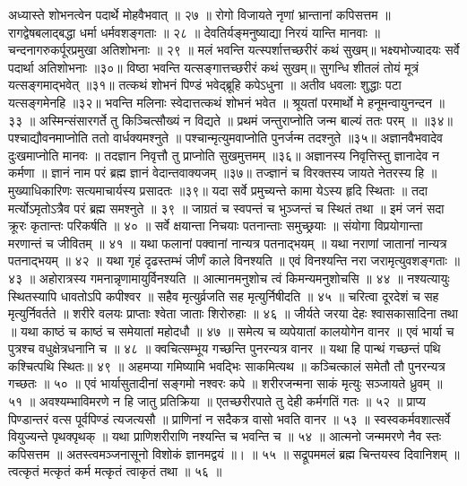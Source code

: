 अध्यास्ते शोभनत्वेन पदार्थे मोहवैभवात् ॥ २७ ॥
रोगो विजायते नृणां भ्रान्तानां कपिसत्तम ॥
रागद्वेषबलाद्बद्धा धर्मा धर्मवशङ्गताः ॥ २८ ॥
देवतिर्यङ्मनुष्याद्या निरयं यान्ति मानवाः ॥
चन्दनागरुकर्पूरप्रमुखा अतिशोभनाः ॥ २९ ॥
मलं भवन्ति यत्स्पर्शात्तच्छरीरं कथं सुखम्॥
भक्ष्यभोज्यादयः सर्वे पदार्था अतिशोभनाः ॥३०॥
विष्ठा भवन्ति यत्सङ्गात्तच्छरीरं कथं सुखम्॥
सुगन्धि शीतलं तोयं मूत्रं यत्सङ्गमाद्भवेत् ॥३१॥
तत्कथं शोभनं पिण्डं भवेद्ब्रूहि कपेऽधुना ॥
अतीव धवलाः शुद्धाः पटा यत्सङ्गमेनहि ॥३२॥
भवन्ति मलिनाः स्वेदात्तत्कथं शोभनं भवेत ॥
श्रूयतां परमार्थो मे हनूमन्वायुनन्दन ॥ ३३ ॥
अस्मिन्संसारगर्ते तु किञ्चित्सौख्यं न विद्यते ॥
प्रथमं जन्तुराप्नोति जन्म बाल्यं ततः परम् ॥ ॥३४॥
पश्चाद्यौवनमाप्नोति ततो वार्धक्यमश्नुते ॥
पश्चान्मृत्युमवाप्नोति पुनर्जन्म तदश्नुते ॥३५॥
अज्ञानवैभवादेव दुःखमाप्नोति मानवः ॥
तदज्ञान निवृत्तौ तु प्राप्नोति सुखमुत्तमम् ॥३६॥
अज्ञानस्य निवृत्तिस्तु ज्ञानादेव न कर्मणा ॥
ज्ञानं नाम परं ब्रह्म ज्ञानं वेदान्तवाक्यजम् ॥३७॥
तज्ज्ञानं च विरक्तस्य जायते नेतरस्य हि ॥
मुख्याधिकारिणः सत्यमाचार्यस्य प्रसादतः ॥३९॥
यदा सर्वे प्रमुच्यन्ते कामा येऽस्य हृदि स्थिताः ॥
तदा मर्त्योऽमृतोऽत्रैव परं ब्रह्म समश्नुते ॥ ३९ ॥
जाग्रतं च स्वपन्तं च भुञ्जन्तं च स्थितं तथा ॥
इमं जनं सदा क्रूरः कृतान्तः परिकर्षति ॥ ४० ॥
सर्वे क्षयान्ता निचयाः पतनान्ताः समुच्छ्रयाः ॥
संयोगा विप्रयोगान्ता मरणान्तं च जीवितम् ॥ ४१ ॥
यथा फलानां पक्वानां नान्यत्र पतनाद्भयम् ॥
यथा नराणां जातानां नान्यत्र पतनाद्भयम् ॥ ४२ ॥
यथा गृहं दृढस्तम्भं जीर्णं काले विनश्यति ॥
एवं विनश्यन्ति नरा जरामृत्युवशङ्गताः ॥ ४३ ॥
अहोरात्रस्य गमनान्नृणामायुर्विनश्यति ॥
आत्मानमनुशोच त्वं किमन्यमनुशोचसि ॥ ४४ ॥
नश्यत्यायुः स्थितस्यापि धावतोऽपि कपीश्वर ॥
सहैव मृत्युर्व्रजति सह मृत्युर्निषीदति ॥ ४५ ॥
चरित्वा दूरदेशं च सह मृत्युर्निवर्तते ॥
शरीरे वलयः प्राप्ताः श्वेता जाताः शिरोरुहाः ॥ ४६ ॥
जीर्यते जरया देहः श्वासकासादिना तथा ॥
यथा काष्ठं च काष्ठं च समेयातां महोदधौ ॥ ४७ ॥
समेत्य च व्यपेयातां कालयोगेन वानर ॥
एवं भार्या च पुत्रश्च वधुक्षेत्रधनानि च ॥ ४८ ॥
क्वचित्सम्भूय गच्छन्ति पुनरन्यत्र वानर ॥
यथा हि पान्थं गच्छन्तं पथि कश्चित्पथि स्थितः॥ ४९ ॥
अहमप्या गमिष्यामि भवद्भिः साकमित्यथ ॥
कञ्चित्कालं समेतौ तौ पुनरन्यत्र गच्छतः ॥ ५० ॥
एवं भार्यासुतादीनां सङ्गमो नश्वरः कपे ॥
शरीरजन्मना साकं मृत्युः सञ्जायते ध्रुवम् ॥ ५१ ॥
अवश्यम्भाविमरणे न हि जातु प्रतिक्रिया ॥
एतच्छरीरपाते तु देही कर्मगतिं गतः ॥ ५२ ॥
प्राप्य पिण्डान्तरं वत्स पूर्वपिण्डं त्यजत्यसौ ॥
प्राणिनां न सदैकत्र वासो भवति वानर ॥ ५३ ॥
स्वस्वकर्मवशात्सर्वे वियुज्यन्ते पृथक्पृथक् ॥
यथा प्राणिशरीराणि नश्यन्ति च भवन्ति च ॥ ५४ ॥
आत्मनो जन्ममरणे नैव स्तः कपिसत्तम ॥
अतस्त्वमञ्जनासूनो विशोकं ज्ञानमद्वयं ॥। ॥ ५५ ॥
सद्रूपममलं ब्रह्म चिन्तयस्व दिवानिशम् ॥
त्वत्कृतं मत्कृतं कर्म मत्कृतं त्वाकृतं तथा ॥ ५६ ॥
